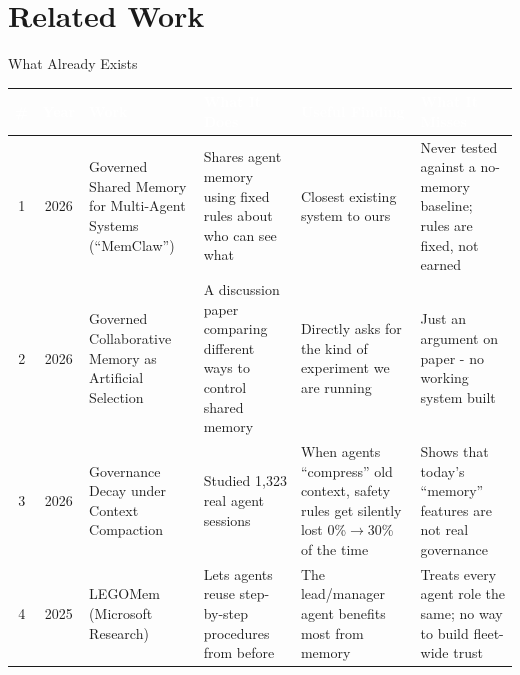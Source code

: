 \documentclass{beamer}
\begin{document}
\section{Related Work}
\begin{frame}{What Already Exists}
\scriptsize
\setlength{\tabcolsep}{3pt}
\renewcommand{\arraystretch}{1.25}

\begin{tabular}{|c|c|p{2.8cm}|p{2.5cm}|p{2.4cm}|p{2.2cm}|}
\hline
\rowcolor{blue!70}
\textcolor{white}{\textbf{\#}} &
\textcolor{white}{\textbf{Year}} &
\textcolor{white}{\textbf{Work}} &
\textcolor{white}{\textbf{What It Does}} &
\textcolor{white}{\textbf{Useful Finding}} &
\textcolor{white}{\textbf{What It Misses}} \\
\hline

\rowcolor{blue!8}
1 & 2026 &
Governed Shared Memory for Multi-Agent Systems (``MemClaw'') &
Shares agent memory using fixed rules about who can see what &
Closest existing system to ours &
Never tested against a no-memory baseline; rules are fixed, not earned \\
\hline

2 & 2026 &
Governed Collaborative Memory as Artificial Selection &
A discussion paper comparing different ways to control shared memory &
Directly asks for the kind of experiment we are running &
Just an argument on paper - no working system built \\
\hline

\rowcolor{blue!8}
3 & 2026 &
Governance Decay under Context Compaction &
Studied 1,323 real agent sessions &
When agents ``compress'' old context, safety rules get silently lost 0\%$\to$30\% of the time &
Shows that today's ``memory'' features are not real governance \\
\hline

4 & 2025 &
LEGOMem (Microsoft Research) &
Lets agents reuse step-by-step procedures from before &
The lead/manager agent benefits most from memory &
Treats every agent role the same; no way to build fleet-wide trust \\
\hline

\end{tabular}
\end{frame}
\end{document}
